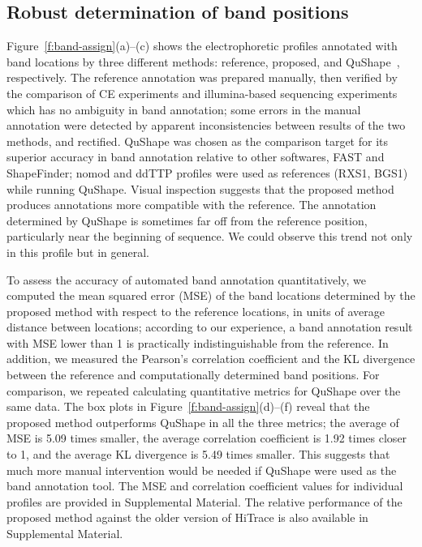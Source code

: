 \subsection{Robust determination of band positions}\label{ss:band-position}
Figure~\ref{f:band-assign}(a)--(c) shows the electrophoretic profiles annotated with band locations by three different methods: reference, proposed, and QuShape~\citep{Karabiber2013}, respectively. The reference annotation was prepared manually, then verified by the comparison of CE experiments and illumina-based sequencing experiments~\citep{Kladwang2014} which has no ambiguity in band annotation; some errors in the manual annotation were detected by apparent inconsistencies between results of the two methods, and rectified. QuShape was chosen as the comparison target for its superior accuracy in band annotation relative to other softwares, FAST and ShapeFinder; nomod and ddTTP profiles were used as references (RXS1, BGS1) while running QuShape. Visual inspection suggests that the proposed method produces annotations more compatible with the reference. The annotation determined by QuShape is sometimes far off from the reference position, particularly near the beginning of sequence. We could observe this trend not only in this profile but in general.

To assess the accuracy of automated band annotation quantitatively, we computed the mean squared error (MSE) of the band locations determined by the proposed method with respect to the reference locations, in units of average distance between locations; according to our experience, a band annotation result with MSE lower than 1 is practically indistinguishable from the reference. In addition, we measured the Pearson's correlation coefficient and the KL divergence between the reference and computationally determined band positions. For comparison, we repeated calculating quantitative metrics for QuShape over the same data. The box plots in Figure~\ref{f:band-assign}(d)--(f) reveal that the proposed method outperforms QuShape in all the three metrics; the average of MSE is 5.09 times smaller, the average correlation coefficient is 1.92 times closer to 1, and the average KL divergence is 5.49 times smaller. This suggests that much more manual intervention would be needed if QuShape were used as the band annotation tool.
The MSE and correlation coefficient values for individual profiles are provided in Supplemental Material. The relative performance of the proposed method against the older version of HiTrace is also available in Supplemental Material.

